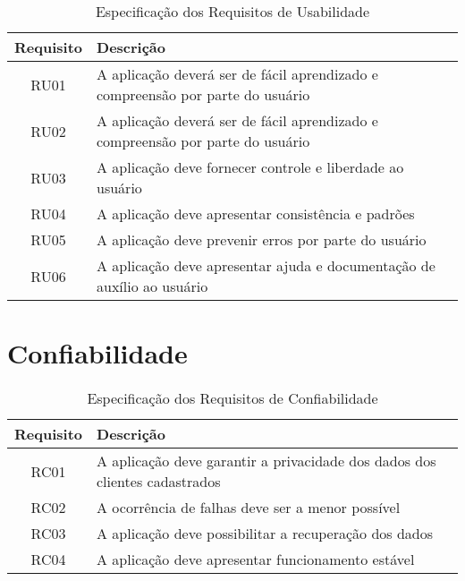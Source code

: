\begin{apendicesenv}
\begin{table}[H]
                \centering
                \caption{Especificação dos Requisitos de Usabilidade}
                \begin{tabular}{c|p{10cm}}
                    \hline
                    \textbf{Requisito}            & \textbf{Descrição}\\
                    \hline
                    RU01 & A aplicação deverá ser de fácil aprendizado e compreensão por parte do usuário \\ 
                    \hline
                    RU02 & A aplicação deverá ser de fácil aprendizado e compreensão por parte do usuário \\ 
                    RU03 & A aplicação deve fornecer controle e liberdade ao usuário\\ 
                    \hline
                    RU04 & A aplicação deve apresentar consistência e padrões\\
                    \hline
                    RU05 & A aplicação deve prevenir erros por parte do usuário\\
                    \hline
                    RU06 & A aplicação deve apresentar ajuda e documentação de auxílio ao usuário\\
                    \hline                    
                \end{tabular}
            \end{table}


{\large {\section { Confiabilidade \\ } } }

\begin{table}[H]
                \centering
                \caption{Especificação dos Requisitos de Confiabilidade}
                \begin{tabular}{c|p{10cm}}
                    \hline
                    \textbf{Requisito}            & \textbf{Descrição}\\
                    \hline
                    RC01 & A aplicação deve garantir a privacidade dos dados dos clientes cadastrados\\
                    \hline
                    RC02 & A ocorrência de falhas deve ser a menor possível\\ 
                    \hline
                    RC03 & A aplicação deve possibilitar a recuperação dos dados\\
                    \hline
                    RC04 & A aplicação deve apresentar funcionamento estável\\
                    \hline                   
                \end{tabular}
            \end{table}



\end{apendicesenv}
